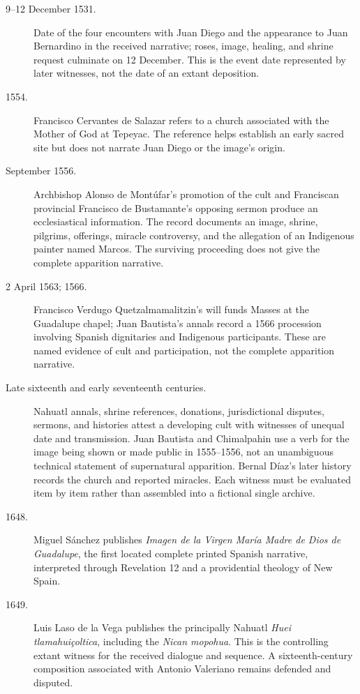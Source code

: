 \begin{description}
  \item[9--12 December 1531.] Date of the four encounters with Juan Diego and the appearance to Juan Bernardino in the received narrative; roses, image, healing, and shrine request culminate on 12 December. This is the event date represented by later witnesses, not the date of an extant deposition.

  \item[1554.] Francisco Cervantes de Salazar refers to a church associated with the Mother of God at Tepeyac. The reference helps establish an early sacred site but does not narrate Juan Diego or the image's origin.

  \item[September 1556.] Archbishop Alonso de Montúfar's promotion of the cult and Franciscan provincial Francisco de Bustamante's opposing sermon produce an ecclesiastical information. The record documents an image, shrine, pilgrims, offerings, miracle controversy, and the allegation of an Indigenous painter named Marcos. The surviving proceeding does not give the complete apparition narrative.

  \item[2 April 1563; 1566.] Francisco Verdugo Quetzalmamalitzin's will funds Masses at the Guadalupe chapel; Juan Bautista's annals record a 1566 procession involving Spanish dignitaries and Indigenous participants. These are named evidence of cult and participation, not the complete apparition narrative.

  \item[Late sixteenth and early seventeenth centuries.] Nahuatl annals, shrine references, donations, jurisdictional disputes, sermons, and histories attest a developing cult with witnesses of unequal date and transmission. Juan Bautista and Chimalpahin use a verb for the image being shown or made public in 1555--1556, not an unambiguous technical statement of supernatural apparition. Bernal Díaz's later history records the church and reported miracles. Each witness must be evaluated item by item rather than assembled into a fictional single archive.

  \item[1648.] Miguel Sánchez publishes \emph{Imagen de la Virgen María Madre de Dios de Guadalupe}, the first located complete printed Spanish narrative, interpreted through Revelation 12 and a providential theology of New Spain.

  \item[1649.] Luis Laso de la Vega publishes the principally Nahuatl \emph{Huei tlamahuiçoltica}, including the \emph{Nican mopohua}. This is the controlling extant witness for the received dialogue and sequence. A sixteenth-century composition associated with Antonio Valeriano remains defended and disputed.


\end{description}
